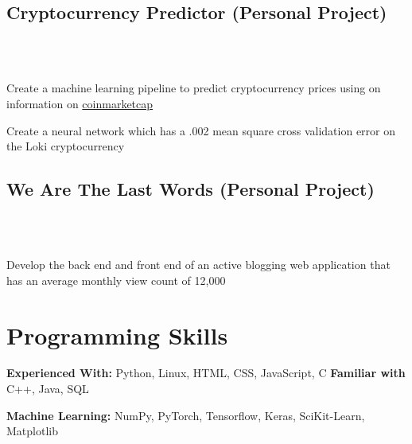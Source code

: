 \documentclass{resume}
\begin{document}
\subsection{Cryptocurrency Predictor (Personal Project)} \\
\\
\begin{tightemize}
    \item Create a machine learning pipeline to predict cryptocurrency prices using on information on {\href{https://coinmarketcap.com/}{coinmarketcap}}
    \item Create a neural network which has a .002 mean square cross validation error on the Loki cryptocurrency
\end{tightemize}

\subsection{We Are The Last Words (Personal Project)}\\
\\
\begin{tightemize}
    \item Develop the back end and front end  of an active blogging web application that has an average monthly view count of 12,000
\end{tightemize}


\section{Programming Skills}

\fontsize{10.5pt}{12pt}\selectfont
\vspace{-1mm}

\textbf{Experienced With:}\hspace{1mm} Python, Linux, HTML, CSS, JavaScript, C\hspace{1.5mm} \textbf{Familiar with} C++, Java, SQL\vspace{-1mm}

\textbf{Machine Learning:}\hspace{1mm} NumPy, PyTorch, Tensorflow, Keras, SciKit-Learn, Matplotlib\vspace{-1mm}
\end{document}
